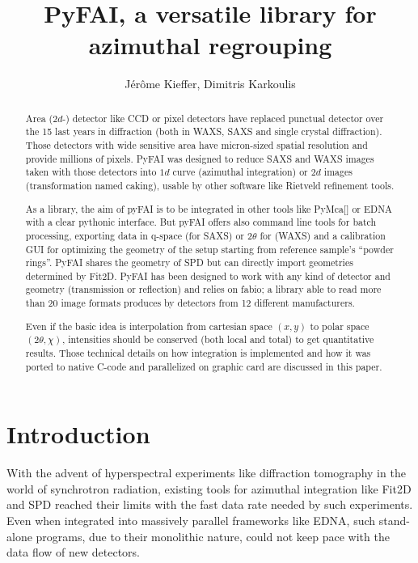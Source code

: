 \documentclass[a4paper]{jpconf}
\begin{document}
\title{PyFAI, a versatile library for azimuthal regrouping}

\author{J\'er\^ome Kieffer, Dimitris Karkoulis}

\address{European Synchrotron Radiation Facility; 6 rue Jules Horowitz;
38043 Grenoble; France}


\begin{abstract}
Area ($2d$-) detector like CCD or pixel detectors have replaced punctual detector
over the 15 last years in diffraction (both in WAXS, SAXS and single crystal
diffraction). Those detectors with wide sensitive area have micron-sized spatial
resolution and provide millions of pixels. PyFAI was designed to reduce SAXS and
WAXS images taken with those detectors into $1d$ curve (azimuthal integration)
or $2d$ images (transformation named caking), usable by other software like Rietveld
refinement tools.

As a library, the aim of pyFAI is to be integrated in other tools like PyMca[]
or EDNA\cite{edna} with a clear pythonic interface. But pyFAI offers also
command line tools for batch processing, exporting data in q-space (for SAXS) or 2$\theta$ for
(WAXS) and a calibration GUI for optimizing the geometry of the setup starting
from  reference sample's “powder rings”.  PyFAI shares the geometry of
SPD\cite{spd} but can directly import geometries determined by
Fit2D\cite{fit2d}.
PyFAI has been designed to work with any kind of detector and geometry (transmission or reflection) and
relies on fabio; a library able to read more than 20 image formats
produces by  detectors from 12 different manufacturers.

Even if the basic idea is interpolation from cartesian space $(x,y)$ to polar
space $(2\theta, \chi )$, intensities should be conserved (both local and total)
to get quantitative results.  Those technical details on how integration is implemented
and how it was ported to native C-code and parallelized on graphic card are
discussed  in this paper.
\end{abstract}

\section{Introduction}

With the advent of hyperspectral experiments like diffraction tomography in the
world of synchrotron radiation, existing tools for azimuthal integration like
Fit2D\cite{fit2d} and SPD\cite{spd} reached their limits with the fast data rate
needed by such experiments. Even when integrated into massively parallel
frameworks like EDNA\cite{edna}, such stand-alone programs, due to their
monolithic nature,  could not keep pace with the data flow of new detectors.
\end{document}
